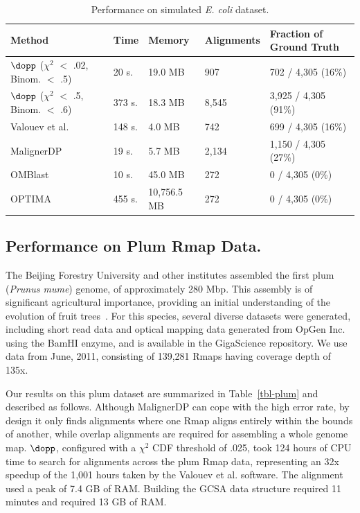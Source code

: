 \documentclass[doctor]{thesis}
\begin{document}
\begin{table}[htb]
  \small
  \centering
  \begin{tabular}{l|l|l|l|l}
	{\bf Method}	& {\bf Time}		& {\bf Memory} 	& {\bf Alignments } & {\bf Fraction of Ground Truth}\\
	\hline
	\hline
	   	 $\dopp$ ($\chi^2$  $<$ .02, Binom. $<$ .5)    	 	& 20 s.		& 19.0 MB & 907 & 702 / 4,305  (16\%)\\
   	 $\dopp$ ($\chi^2$  $<$ .5, Binom. $<$ .6)    	 	& 373 s. 		& 18.3 MB & 8,545	& 3,925 / 4,305 (91\%) \\
	Valouev et al. 		& 148 s. 	& 4.0 MB		&  742 & 699 / 4,305 (16\%) \\
    MalignerDP          & 19 s.     & 5.7 MB        & 2,134 & 1,150 / 4,305 (27\%) \\
    OMBlast              & 10 s.     & 45.0 MB       & 272  & 0 / 4,305 (0\%) \\
    OPTIMA              & 455 s.     & 10,756.5 MB       & 272  & 0 / 4,305 (0\%) \\    
	\end{tabular}
      \caption{Performance on simulated {\it E. coli} dataset.}
 \label{tbl-ecoli}
\end{table}






\subsection{Performance on Plum Rmap Data.} \label{section:plum}

The Beijing Forestry University
and other institutes assembled the first plum ({\em Prunus mume}) genome, of approximately 280 Mbp.  
This assembly is of significant agricultural importance, providing an initial understanding of the evolution of fruit trees~\cite{plum}.  For this species, several diverse datasets were generated, including short read data 
and optical mapping data generated from OpGen Inc. using the BamHI enzyme, 
and is available in the GigaScience repository.
We use data from June, 2011, consisting of 139,281 Rmaps having coverage depth of 135x.

Our results on this plum dataset are summarized in Table~\ref{tbl-plum} and described as follows.  Although MalignerDP can cope with the high error rate, by design it only finds alignments where one Rmap aligns entirely within the bounds of another, while overlap alignments are required for assembling a whole genome map. $\dopp$, configured with a $\chi^2$ CDF threshold of .025, took 124 hours of CPU time to search for alignments across the plum Rmap data, representing an 32x speedup of the 1,001 hours taken by the Valouev et al. software.  The alignment used a peak of 7.4 GB of RAM.  Building the GCSA data structure required 11  minutes and required 13 GB of RAM.
\end{document}
